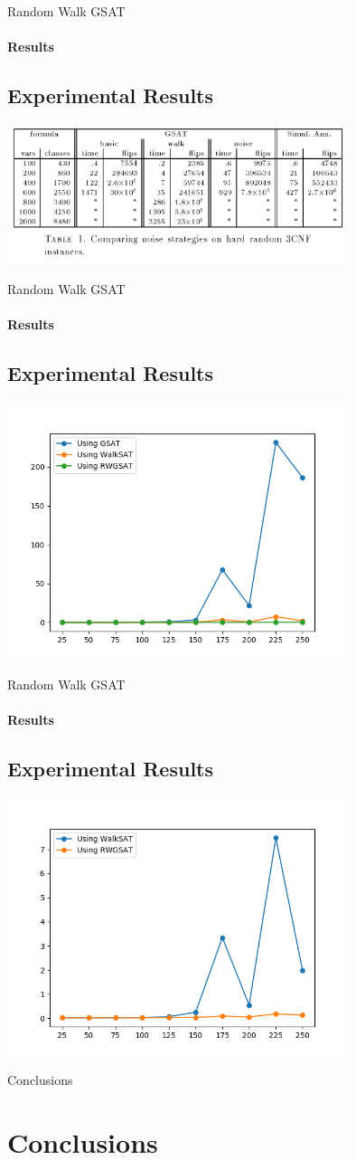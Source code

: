 \documentclass{beamer}
\begin{document}
\begin{frame}{Random Walk GSAT}
\framesubtitle{Results}
\subsection{Experimental Results}

\includegraphics[width=10cm]{imgs/tab1.png}

\end{frame}
\begin{frame}{Random Walk GSAT}
\framesubtitle{Results}
\subsection{Experimental Results}

\includegraphics[width=10cm]{imgs/50-graphic-2.png}

\end{frame}
\begin{frame}{Random Walk GSAT}
\framesubtitle{Results}
\subsection{Experimental Results}

\includegraphics[width=10cm]{imgs/50-graphic-1.png}

\end{frame}
\begin{frame}{Conclusions}
\section{Conclusions}

\end{frame}
\end{document}
